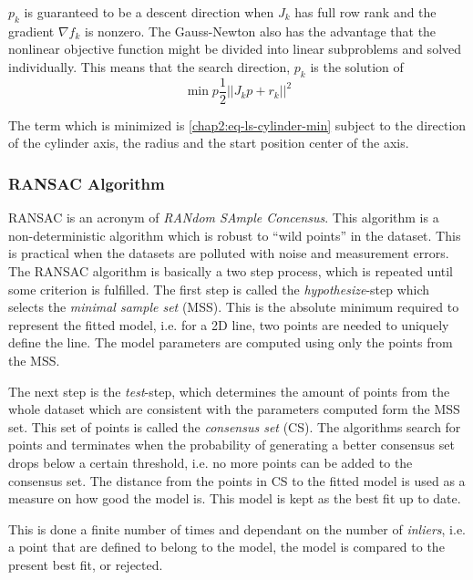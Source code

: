$p_k$ is guaranteed to be a descent direction when $J_k$ has full row rank and the
gradient $\nabla f_k$ is nonzero. The Gauss-Newton also has the advantage that the
nonlinear objective function might be divided into linear subproblems and solved
individually. This means that the search direction, $p_k$ is the solution of
\begin{equation}
    \min{p} \frac{1}{2} || J_k p + r_k ||^2
\end{equation}

The term which is minimized is \eqref{chap2:eq-ls-cylinder-min} subject to the direction
of the cylinder axis, the radius and the start position center of the axis. 


\subsubsection{RANSAC Algorithm}
RANSAC is an acronym of \emph{RANdom SAmple Concensus}. This algorithm is a
non-deterministic algorithm which is robust to ``wild points'' in the dataset. This is
practical when the datasets are polluted with noise and measurement errors.
The RANSAC algorithm is basically a two step process, which is repeated until some
criterion is fulfilled. The first step is called the \emph{hypothesize}-step which selects
the \emph{minimal sample set} (MSS). This is the absolute minimum required to represent
the fitted model, i.e. for a 2D line, two points are needed to uniquely define the
line. The model parameters are computed using only the points from the MSS.

The next step is the \emph{test}-step, which determines the amount of points from the
whole dataset which are consistent with the parameters computed form the MSS set. This set
of points is called the \emph{consensus set} (CS). The algorithms search for points and
terminates when the probability of generating a better consensus set drops below a certain threshold, i.e.
no more points can be added to the consensus set. The distance from the points in CS to the 
fitted model is used as a measure on how good the model is. This model is kept as the best
fit up to date. \cite{ransac-dummies}

This is done a finite number of times and dependant on the number of \emph{inliers}, i.e.
a point that are defined to belong to the model, the model is compared to the present best
fit, or rejected.

